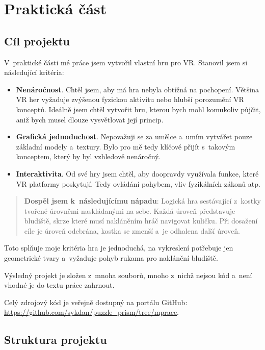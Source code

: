 \part{Praktická část}

\chapter{Cíl projektu}

V~praktické části mé práce jsem vytvořil vlastní hru pro VR. Stanovil jsem si následující kritéria:

\begin{itemize}
  \item \textbf{Nenáročnost}. Chtěl jsem, aby má hra nebyla obtížná na pochopení. Většina VR her vyžaduje zvýšenou fyzickou aktivitu nebo hlubší porozumění VR konceptů. Ideálně jsem chtěl vytvořit hru, kterou bych mohl komukoliv půjčit, aniž bych musel dlouze vysvětlovat její princip.
  \item \textbf{Grafická jednoduchost}. Nepovažuji se za umělce a~umím vytvářet pouze základní modely a~textury. Bylo pro mě tedy klíčové přijít s~takovým konceptem, který by byl vzhledově nenáročný.
  \item \textbf{Interaktivita}. Od své hry jsem chtěl, aby doopravdy využívala funkce, které VR platformy poskytují. Tedy ovládání pohybem, vliv fyzikálních zákonů atp.
\end{itemize}

\begin{quotation}
  \textbf{Dospěl jsem k~následujícímu nápadu}: Logická hra sestávající z~kostky tvořené úrovněmi naskládanými na sebe. Každá úroveň představuje bludiště, skrze které musí nakláněním hráč navigovat kuličku. Při dosažení cíle je úroveň odebrána, kostka se zmenší a~je odhalena další úroveň.
\end{quotation}

Toto splňuje moje kritéria \poml hra je jednoduchá, na vykreslení potřebuje jen geometrické tvary a~vyžaduje pohyb rukama pro naklánění bludiště.

Výsledný projekt je složen z~mnoha souborů, mnoho z~nichž nejsou kód a~není vhodné je do textu práce zahrnout. 

Celý zdrojový kód je veřejně dostupný na portálu GitHub: \url{https://github.com/sykdan/puzzle_prism/tree/mprace}.

\chapter{Struktura projektu}

